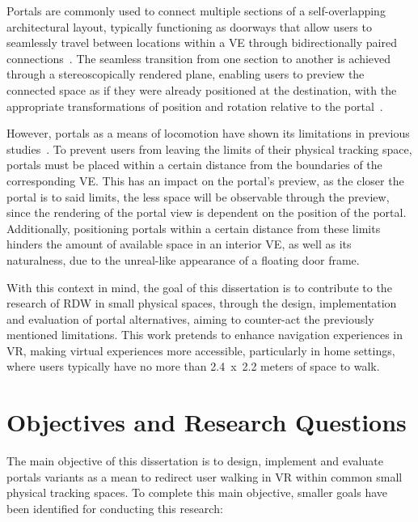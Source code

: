 Portals are commonly used to connect multiple sections of a self-overlapping architectural layout, typically functioning as doorways that allow users 
to seamlessly travel between locations within a \gls{VE} through bidirectionally paired connections~\cite{Freitag2014,Lochner2021,Liu2018b}.
The seamless transition from one section to another is achieved through a stereoscopically rendered plane, enabling users to preview the connected 
space as if they were already positioned at the destination, with the appropriate transformations of position and rotation
relative to the portal~\cite{Lochner2021,Jaksties2022}.

However, portals as a means of locomotion have shown its limitations in previous studies~\cite{Ferreira2025,Rebelo2025}. 
To prevent users from leaving the limits of their physical tracking space, portals must be placed within a certain distance from the boundaries 
of the corresponding \gls{VE}. This has an impact on the portal's preview, as the closer the portal is to said limits, 
the less space will be observable through the preview, since the rendering of the portal view is dependent on the position of the portal. 
Additionally, positioning portals within a certain distance from these limits hinders the amount of available space in an interior \gls{VE}, 
as well as its naturalness, due to the unreal-like appearance of a floating door frame. 

With this context in mind, the goal of this dissertation is to contribute to the research of \gls{RDW} in small physical spaces, through the design,
implementation and evaluation of portal alternatives, aiming to counter-act the previously mentioned limitations.
This work pretends to enhance navigation experiences in \gls{VR}, making virtual experiences more accessible, particularly in home settings, 
where users typically have no more than 2.4~x~2.2 meters of space to walk.


\section{Objectives and Research Questions}
\label{sec:objectives-and-researh-questions}

The main objective of this dissertation is to design, implement and evaluate portals variants as a mean to redirect user walking 
in \gls{VR} within common small physical tracking spaces.
To complete this main objective, smaller goals have been identified for conducting this research:

